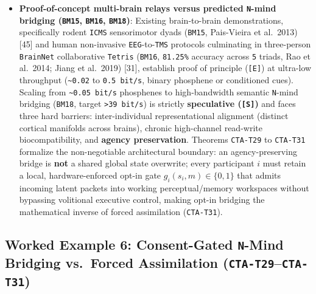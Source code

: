 \documentclass[10pt,letterpaper]{article}
\begin{document}
\begin{itemize}
  requirements. Crucially, closing the read-write loop inside a single
  human brain already multiplies functional agency (\texttt{{[}E{]}}):
  bidirectional \texttt{M1}-read plus \texttt{S1} tactile \texttt{ICMS}
  (\texttt{BM09}, Flesher et al.~2016, 2021) {[}23{]} cut robotic
  object-transfer times roughly in half
  (\texttt{\textasciitilde{}20.9\ s} down to
  \texttt{\textasciitilde{}10.2\ s}), and blinded randomized crossover
  trials of chronic adaptive \texttt{DBS} in Parkinson's disease
  (\texttt{BM12}, Oehrn et al.~2024; Shanechi 2019) {[}43{]}
  outperformed open-loop continuous stimulation on symptom control.
\item
  \textbf{Proof-of-concept multi-brain relays versus predicted
  \texttt{N}-mind bridging (\texttt{BM15}, \texttt{BM16},
  \texttt{BM18})}: Existing brain-to-brain demonstrations, specifically
  rodent \texttt{ICMS} sensorimotor dyads (\texttt{BM15}, Pais-Vieira et
  al.~2013) {[}45{]} and human non-invasive \texttt{EEG}-to-\texttt{TMS}
  protocols culminating in three-person \texttt{BrainNet} collaborative
  \texttt{Tetris} (\texttt{BM16}, \texttt{81.25\%} accuracy across
  \texttt{5} triads, Rao et al.~2014; Jiang et al.~2019) {[}31{]},
  establish proof of principle (\texttt{{[}E{]}}) at ultra-low
  throughput (\texttt{\textasciitilde{}0.02} to \texttt{0.\allowbreak{}5\ bit/\allowbreak{}s},
  binary phosphene or conditioned cues). Scaling from
  \texttt{\textasciitilde{}0.05\ bit/s} phosphenes to high-bandwidth
  semantic \texttt{N}-mind bridging (\texttt{BM18}, target
  \texttt{\textgreater{}39\ bit/s}) is strictly \textbf{speculative
  (\texttt{{[}S{]}})} and faces three hard barriers: inter-individual
  representational alignment (distinct cortical manifolds across
  brains), chronic high-channel read-write biocompatibility, and
  \textbf{agency preservation}. Theorems \texttt{CTA-T29} to
  \texttt{CTA-T31} formalize the non-negotiable architectural boundary:
  an agency-preserving bridge is \textbf{not} a shared global state
  overwrite; every participant \(i\) must retain a local,
  hardware-enforced opt-in gate \(g_i(s_i, m) \in \{0, 1\}\) that admits
  incoming latent packets into working perceptual/memory workspaces
  without bypassing volitional executive control, making opt-in bridging
  the mathematical inverse of forced assimilation (\texttt{CTA-T31}).
\end{itemize}

\subsection{\texorpdfstring{Worked Example 6: Consent-Gated
\texttt{N}-Mind Bridging vs.~Forced Assimilation
(\texttt{CTA-T29}--\texttt{CTA-T31})}{Worked Example 6: Consent-Gated N-Mind Bridging vs.~Forced Assimilation (CTA-T29--CTA-T31)}}\label{worked-example-6-consent-gated-n-mind-bridging-vs.-forced-assimilation-cta-t29cta-t31}
\end{document}
